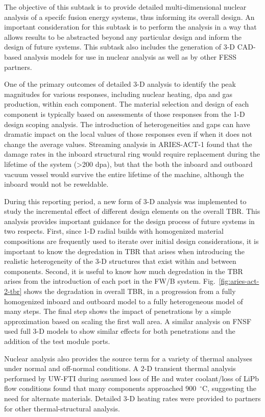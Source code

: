 The objective of this subtask is to provide detailed multi-dimensional nuclear
analysis of a specifc fusion energy systems, thus informing its overall
design.  An important consideration for this subtask is to perform the
analysis in a way that allows results to be abstracted beyond any particular
design and inform the design of future systems.  This subtask also includes
the generation of 3-D CAD-based analysis models for use in nuclear analysis as
well as by other \gls{FESS} partners.

One of the primary outcomes of detailed 3-D analysis to identify the peak
magnitudes for various responses, including nuclear heating, dpa and gas
production, within each component.  The material selection and design of each
component is typically based on assessments of those responses from the 1-D
design scoping analysis.  The introduction of heterogeneities and gaps can
have dramatic impact on the local values of those responses even if when it
does not change the average values.  Streaming analysis in ARIES-ACT-1 found
that the damage rates in the inboard structural ring would require replacement
during the lifetime of the system (>200 dpa), but that the both the inboard
and outboard vacuum vessel would survive the entire lifetime of the machine,
although the inboard would not be reweldable.

During this reporting period, a new form of 3-D analysis was implemented to
study the incremental effect of different design elements on the overall
\gls{TBR}.  This analysis provides important guidance for the design process
of future systems in two respects.  First, since 1-D radial builds with
homogenized material compositions are frequently used to iterate over initial
design considerations, it is important to know the degredation in \gls{TBR}
that arises when introducing the realistic heterogeneity of the 3-D structures
that exist within and between components.  Second, it is useful to know how
much degredation in the \gls{TBR} arises from the introduction of each port in
the \gls{FW/B} system.  Fig.\ \ref{fig:aries-act-2-tbr} shows the degradation
in overall \gls{TBR}, in a progression from a fully homogenized inboard and
outboard model to a fully heterogeneous model of many steps.  The final step
shows the impact of penetrations by a simple approximation based on scaling
the first wall area.  A similar analysis on FNSF used full 3-D models to show
similar effects for both penetrations and the addition of the test module
ports.

Nuclear analysis also provides the source term for a variety of thermal
analyses under normal and off-normal conditions.  A 2-D transient thermal
analysis performed by \gls{UW-FTI} during assumed loss of He and water
coolant/loss of LiPb flow conditions found that many components approached
900\ $^\circ$C, suggesting the need for alternate materials.  Detailed 3-D
heating rates were provided to partners for other thermal-structural analysis.

